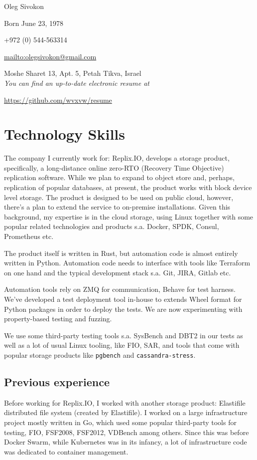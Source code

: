 \documentclass[11pt]{article}
\author{Oleg Sivokon}
\date{\textit{<2019-07-24 Wed>}}
\title{}
\begin{document}
\begin{center}
Oleg Sivokon

Born June 23, 1978

+972 (0) 544-563314

\url{mailto:olegsivokon@gmail.com}

Moshe Sharet 13, Apt. 5, Petah Tikva, Israel \\[18pt]

\small \emph{You can find an up-to-date electronic resume at}

\url{https://github.com/wvxvw/resume} \\[48pt]
\end{center}

\section*{Technology Skills}
\label{sec:org6fc0f09}
The company I currently work for: Replix.IO, develops a storage
product, specifically, a long-distance online zero-RTO (Recovery
Time Objective) replication software.  While we plan to expand to
object store and, perhaps, replication of popular databases, at
present, the product works with block device level storage.  The
product is designed to be used on public cloud, however, there's a
plan to extend the service to on-premise installations.  Given this
background, my expertise is in the cloud storage, using Linux
together with some popular related technologies and products
s.a. Docker, SPDK, Consul, Prometheus etc.

The product itself is written in Rust, but automation code is almost
entirely written in Python.  Automation code needs to interface with
tools like Terraform on one hand and the typical development stack
s.a. Git, JIRA, Gitlab etc.

Automation tools rely on ZMQ for communication, Behave for test
harness.  We've developed a test deployment tool in-house to extends
Wheel format for Python packages in order to deploy the tests.  We
are now experimenting with property-based testing and fuzzing.

We use some third-party testing tools s.a. SysBench and DBT2 in our
tests as well as a lot of usual Linux tooling, like FIO, SAR, and
tools that come with popular storage products like \texttt{pgbench} and
\texttt{cassandra-stress}.

\subsection*{Previous experience}
\label{sec:org4954efe}
Before working for Replix.IO, I worked with another storage
product: Elastifile distributed file system (created by
Elastifile).  I worked on a large infrastructure project mostly
written in Go, which used some popular third-party tools for
testing, FIO, FSF2008, FSF2012, VDBench among others.  Since this
was before Docker Swarm, while Kubernetes was in its infancy, a lot
of infrastructure code was dedicated to container management.
\end{document}
